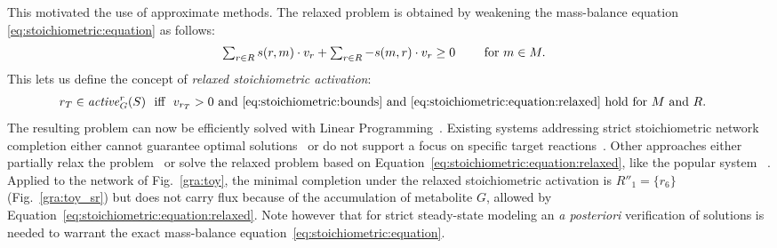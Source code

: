 This motivated the use of approximate methods.
%
The relaxed problem is obtained by weakening the mass-balance equation \eqref{eq:stoichiometric:equation} as follows:
%
\begin{align}
\label{eq:stoichiometric:equation:relaxed}
  &  \textstyle        \sum_{\substack{r\in R}} s(r,m)\cdot v_r
                       +
                       \sum_{\substack{r\in R}}-s(m,r)\cdot v_r
                       \geq
                       0
                       \qquad \text{ for } m\in M.
\end{align}
%
This lets us define the concept of \emph{relaxed stoichiometric activation}:
\begin{align}%
\label{eq:stoichiometric:activation:relaxed}
  r_T \in \Activity{r}{G}{S} & \ \text{ iff } \ v_{r_T} >0 \text{ and }
                               \eqref{eq:stoichiometric:bounds} \text{ and } \eqref{eq:stoichiometric:equation:relaxed}\text{ hold for }M\text{ and }R.
\end{align}%
The resulting problem can now be efficiently solved with Linear Programming~\citep{SatishKumar2007}.
%
Existing systems addressing strict stoichiometric network completion either
cannot guarantee optimal solutions~\citep{laten2014a} or
do not support a focus on specific target reactions~\citep{Thiele2014}.
Other approaches either partially relax the problem~\citep{Vitkin2012} or
solve the relaxed problem based on Equation~\eqref{eq:stoichiometric:equation:relaxed},
like the popular system \gapfill~\citep{SatishKumar2007}. Applied to the network of Fig.~\ref{gra:toy}, the minimal completion under the relaxed stoichiometric activation is $R''_1=\{r_{6}\}$  (Fig.~\ref{gra:toy_sr}) but does not carry flux because of the accumulation of metabolite $G$, allowed by Equation~\eqref{eq:stoichiometric:equation:relaxed}.
%
Note however that for strict steady-state modeling an \textit{a posteriori} verification of solutions is needed
to warrant the exact mass-balance equation~\eqref{eq:stoichiometric:equation}.



